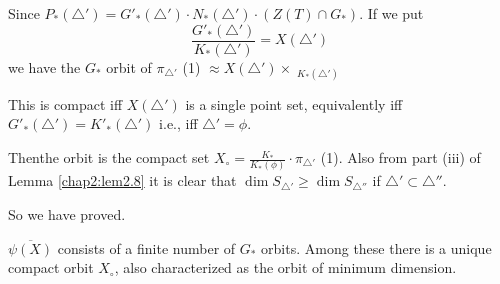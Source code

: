 Since $P_* (\triangle')= G'_* (\triangle') \cdot N_* (\triangle')
\cdot (Z(T) \cap G_*)$. If we put
$$
\frac{G'_* (\triangle')}{K_* (\triangle')}= X (\triangle')
$$
we have the $G_*$ orbit of $\pi_{\triangle'}$ (1)
$\approx X(\triangle') \times \displaystyle{\mathop{K_*}_{K_*
  (\triangle')}}$

This is compact iff $X (\triangle')$ is a single point set,
equivalently iff\break $G'_* (\triangle') = K'_{*}(\triangle')$ i.e., iff
$\triangle'= \phi$.

Then\pageoriginale the orbit is the compact set $X_\circ = \frac{K_*}{K_* (\phi)}
\cdot \pi_{\triangle'}$ (1). Also from part (iii)
of Lemma \ref{chap2:lem2.8} it is clear that $\dim S_{\triangle'} \geq
\dim S_{\triangle''}$ if $\triangle' \subset \triangle''$.

So we have proved.

\begin{theorem*}[(Satake)]
  $\overline{\psi (X)}$ consists of a finite number of {\small $G_*$}
  orbits. Among these there is a unique compact orbit $X_\circ$, also
  characterized as the orbit of minimum dimension.
\end{theorem*}
